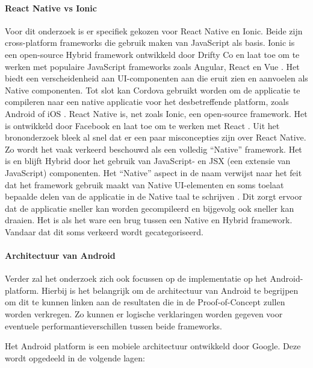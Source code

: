 \paragraph{React Native vs Ionic}
\newline
Voor dit onderzoek is er specifiek gekozen voor React Native en Ionic. Beide zijn cross-platform frameworks die gebruik maken van JavaScript als basis. Ionic is een open-source Hybrid framework ontwikkeld door Drifty Co en laat toe om te werken met populaire JavaScript frameworks zoals Angular, React en Vue \autocite{Bron8}. Het biedt een verscheidenheid aan UI-componenten aan die eruit zien en aanvoelen als Native componenten. Tot slot kan Cordova gebruikt worden om de applicatie te compileren naar een native applicatie voor het desbetreffende platform, zoals Android of iOS \autocite{Bron8}.
React Native is, net zoals Ionic, een open-source framework. Het is ontwikkeld door Facebook en laat toe om te werken met React \autocite{Bron1}. Uit het brononderzoek bleek al snel dat er een paar misconcepties zijn over React Native. Zo wordt het vaak verkeerd beschouwd als een volledig ``Native'' framework. Het is en blijft Hybrid door het gebruik van JavaScript- en JSX (een extensie van JavaScript) componenten. Het ``Native'' aspect in de naam verwijst naar het feit dat het framework gebruik maakt van Native UI-elementen en soms toelaat bepaalde delen van de applicatie in de Native taal te schrijven \autocite{Bron3, Bron2}. Dit zorgt ervoor dat de applicatie sneller kan worden gecompileerd en bijgevolg ook sneller kan draaien. Het is als het ware een brug tussen een Native en Hybrid framework. Vandaar dat dit soms verkeerd wordt gecategoriseerd.

\paragraph{Architectuur van Android}
\newline

Verder zal het onderzoek zich ook focussen op de implementatie op het Android-platform. Hierbij is het belangrijk om de architectuur van Android te begrijpen om dit te kunnen linken aan de resultaten die in de Proof-of-Concept zullen worden verkregen. Zo kunnen er logische verklaringen worden gegeven voor eventuele performantieverschillen tussen beide frameworks.

Het Android platform is een mobiele architectuur ontwikkeld door Google. Deze wordt opgedeeld in de volgende lagen:

